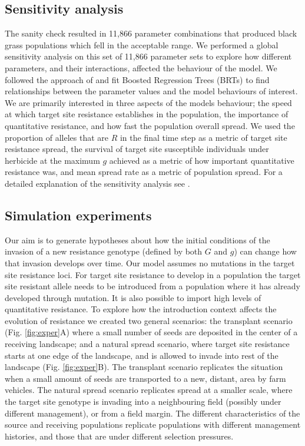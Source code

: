 \documentclass[10pt,letterpaper]{article}
\begin{document}
\subsection*{Sensitivity analysis}
The sanity check resulted in 11,866 parameter combinations that produced black grass populations which fell in the acceptable range. We performed a global sensitivity analysis on this set of 11,866 parameter sets to explore how different parameters, and their interactions, affected the behaviour of the model. We followed the approach of \cite{Cout2014} and fit Boosted Regression Trees (BRTs) to find relationships between the parameter values and the model behaviours of interest. We are primarily interested in three aspects of the models behaviour; the speed at which target site resistance establishes in the population, the importance of quantitative resistance, and how fast the population overall spread. We used the proportion of alleles that are $R$ in the final time step as a metric of target site resistance spread, the survival of target site susceptible individuals under herbicide at the maximum $g$ achieved as a metric of how important quantitative resistance was, and mean spread rate as a metric of population spread. For a detailed explanation of the sensitivity analysis see .

\subsection*{Simulation experiments}
Our aim is to generate hypotheses about how the initial conditions of the invasion of a new resistance genotype (defined by both $G$ and $g$) can change how that invasion develops over time. Our model assumes no mutations in the target site resistance loci. For target site resistance to develop in a population the target site resistant allele needs to be introduced from a population where it has already developed through mutation. It is also possible to import high levels of quantitative resistance. To explore how the introduction context affects the evolution of resistance we created two general scenarios: the transplant scenario (Fig. \ref{fig:exper}A) where a small number of seeds are deposited in the center of a receiving landscape; and a natural spread scenario, where target site resistance starts at one edge of the landscape, and is allowed to invade into rest of the landscape (Fig. \ref{fig:exper}B). The transplant scenario replicates the situation when a small amount of seeds are transported to a new, distant, area by farm vehicles. The natural spread scenario replicates spread at a smaller scale, where the target site genotype is invading into a neighbouring field (possibly under different management), or from a field margin. The different characteristics of the source and receiving populations replicate populations with different management histories, and those that are under different selection pressures.     
\end{document}

